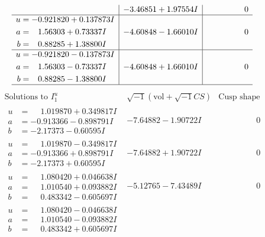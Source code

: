 \documentclass[1p]{elsarticle_modified}
\theoremstyle{definition}
\newcommand{\I}{\sqrt{-1}}
\begin{document}
$$\begin{array}{c|c|c}
 & -3.46851 + 1.97554 I & \phantom{-0.000000 } 0 \\ \hline\begin{aligned}
u &= -0.921820 + 0.137873 I \\
a &= \phantom{-}1.56303 + 0.73337 I \\
b &= \phantom{-}0.88285 + 1.38800 I\end{aligned}
 & -4.60848 - 1.66010 I & \phantom{-0.000000 } 0 \\ \hline\begin{aligned}
u &= -0.921820 - 0.137873 I \\
a &= \phantom{-}1.56303 - 0.73337 I \\
b &= \phantom{-}0.88285 - 1.38800 I\end{aligned}
 & -4.60848 + 1.66010 I & \phantom{-0.000000 } 0\\
 \hline 
 \end{array}$$\newpage$$\begin{array}{c|c|c}  
\text{Solutions to }I^u_{1}& \I (\text{vol} + \sqrt{-1}CS) & \text{Cusp shape}\\
 \hline 
\begin{aligned}
u &= \phantom{-}1.019870 + 0.349817 I \\
a &= -0.913366 - 0.898791 I \\
b &= -2.17373 - 0.60595 I\end{aligned}
 & -7.64882 - 1.90722 I & \phantom{-0.000000 } 0 \\ \hline\begin{aligned}
u &= \phantom{-}1.019870 - 0.349817 I \\
a &= -0.913366 + 0.898791 I \\
b &= -2.17373 + 0.60595 I\end{aligned}
 & -7.64882 + 1.90722 I & \phantom{-0.000000 } 0 \\ \hline\begin{aligned}
u &= \phantom{-}1.080420 + 0.046638 I \\
a &= \phantom{-}1.010540 + 0.093882 I \\
b &= \phantom{-}0.483342 - 0.605697 I\end{aligned}
 & -5.12765 - 7.43489 I & \phantom{-0.000000 } 0 \\ \hline\begin{aligned}
u &= \phantom{-}1.080420 - 0.046638 I \\
a &= \phantom{-}1.010540 - 0.093882 I \\
b &= \phantom{-}0.483342 + 0.605697 I\end{aligned}

\end{array}$$
\end{document}
